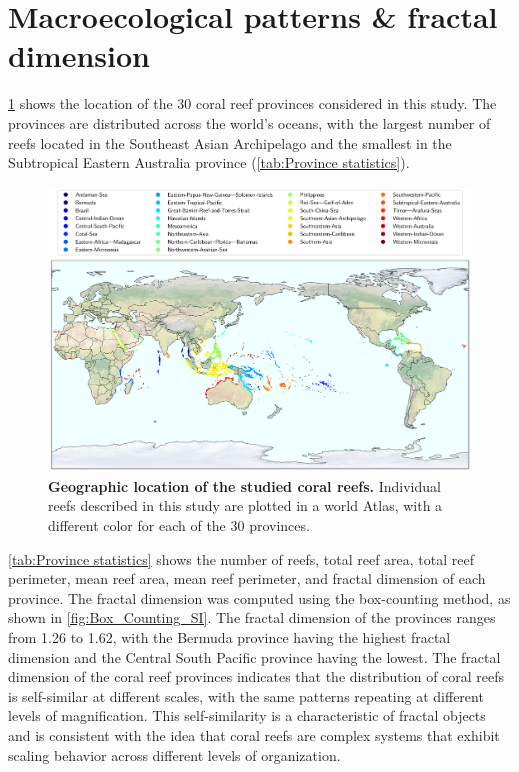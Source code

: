 \newpage
\section{Macroecological patterns \& fractal dimension}

\cref{fig:reef-map} shows the location of the 30 coral reef provinces
considered in this study. The provinces are distributed across the world's
oceans, with the largest number of reefs located in the Southeast Asian
Archipelago and the smallest in the Subtropical Eastern Australia province
(\cref{tab:Province statistics}).

\begin{figure}[H]
    \centering
    \includegraphics[width=\textwidth]{Figures/Coral_reef_centroids.pdf}
    \caption[Geographic location of the studied coral reefs]{\textbf{Geographic
            location of the studied coral reefs.} Individual reefs described in
        this study
        are plotted in a world
        Atlas, with a different color for each of the 30 provinces.}
    \label{fig:reef-map}
\end{figure}

\cref{tab:Province statistics} shows the number of reefs, total reef area,
total reef perimeter, mean reef area, mean reef perimeter, and fractal
dimension of each province. The fractal dimension was computed using the
box-counting method, as shown in \cref{fig:Box_Counting_SI}. The fractal
dimension of the provinces ranges from 1.26 to 1.62, with the Bermuda province
having the highest fractal dimension and the Central South Pacific province
having the lowest. The fractal dimension of the coral reef
provinces indicates that the distribution of coral reefs is self-similar at
different scales, with the same patterns repeating at different levels of
magnification. This self-similarity is a characteristic of fractal objects and
is consistent with the idea that coral reefs are complex systems that exhibit
scaling behavior across different levels of organization.

